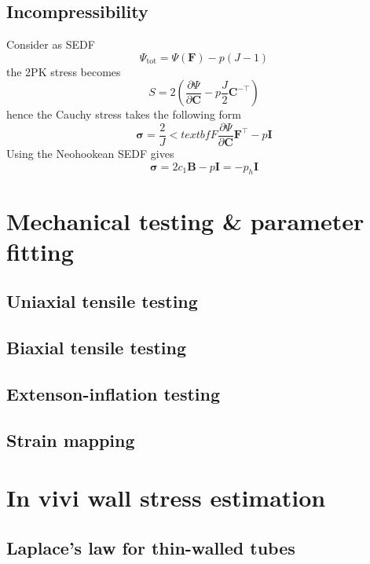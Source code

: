 \documentclass[../main.tex]{subfiles}
\begin{document}
\subsection{Incompressibility}

Consider as SEDF
\begin{equation}
    \Psi_{\text{tot}} = \Psi(\textbf{F}) - p(J-1)
\end{equation}
the 2PK stress becomes
\begin{equation}
    S=2\left(\frac{\partial \Psi}{\partial \textbf{C}} - p \frac{J}{2}\textbf{C}^{-\top}\right)
\end{equation}
hence the Cauchy stress takes the following form
\begin{equation}
    \bm{\sigma} = \frac{2}{J}<textbf{F}\frac{\partial \Psi}{\partial \textbf{C}}\textbf{F}^{\top} - p \textbf{I}
\end{equation}
Using the Neohookean SEDF gives
\begin{equation}
    \bm{\sigma} = 2c_1\textbf{B} - p \textbf{I} = -p_h\textbf{I}
\end{equation}

\section{Mechanical testing \& parameter fitting}

\subsection{Uniaxial tensile testing}

\subsection{Biaxial tensile testing}
\subsection{Extenson-inflation testing}
\subsection{Strain mapping}

\section{In vivi wall stress estimation}

\subsection{Laplace's law for thin-walled tubes}
\end{document}
